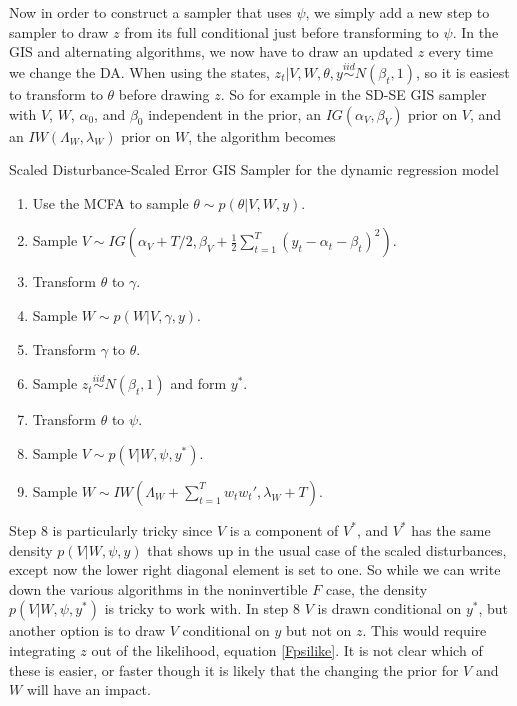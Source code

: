 \documentclass{article}
\begin{document}
Now in order to construct a sampler that uses $\psi$, we simply add a new step to sampler to draw $z$ from its full conditional just before transforming to $\psi$. In the GIS and alternating algorithms, we now have to draw an updated $z$ every time we change the DA. When using the states, $z_t|V,W,\theta,y \stackrel{iid}{\sim}N(\beta_t,1)$, so it is easiest to transform to $\theta$ before drawing $z$. So for example in the SD-SE GIS sampler with $V$, $W$, $\alpha_0$, and $\beta_0$ independent in the prior, an $IG(\alpha_V,\beta_V)$ prior on $V$, and an $IW(\Lambda_W,\lambda_W)$ prior on $W$, the algorithm becomes
\begin{alg*}Scaled Disturbance-Scaled Error GIS Sampler for the dynamic regression model
\begin{enumerate}
\item Use the MCFA to sample $\theta \sim p(\theta|V,W,y)$.
\item Sample $V \sim IG\left(\alpha_V + T/2, \beta_V + \frac{1}{2}\sum_{t=1}^T(y_t - \alpha_t - \beta_t)^2\right)$.
\item Transform $\theta$ to $\gamma$.
\item Sample $W \sim p(W|V,\gamma,y)$.
\item Transform $\gamma$ to $\theta$.
\item Sample $z_t\stackrel{iid}{\sim}N(\beta_t,1)$ and form $y^*$.
\item Transform $\theta$ to $\psi$.
\item Sample $V \sim p(V|W,\psi,y^*)$.
\item Sample $W \sim IW\left(\Lambda_W + \sum_{t=1}^Tw_tw_t',\lambda_{W} + T\right)$.
\end{enumerate}
\end{alg*}\noindent
Step 8 is particularly tricky since $V$ is a component of $V^*$, and $V^*$ has the same density $p(V|W,\psi,y)$ that shows up in the usual case of the scaled disturbances, except now the lower right diagonal element is set to one. So while we can write down the various algorithms in the noninvertible $F$ case, the density $p(V|W,\psi,y^*)$ is tricky to work with. In step 8 $V$ is drawn conditional on $y^*$, but another option is to draw $V$ conditional on $y$ but not on $z$. This would require integrating $z$ out of the likelihood, equation \eqref{Fpsilike}. It is not clear which of these is easier, or faster though it is likely that the changing the prior for $V$ and $W$ will have an impact.
\end{document}
